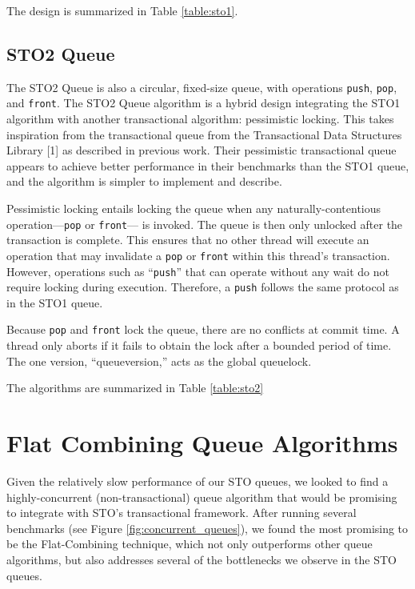 The design is summarized in Table \ref{table:sto1}.

\subsection{STO2 Queue}
%
The STO2 Queue is also a circular, fixed-size queue, with operations \texttt{push}, \texttt{pop}, and \texttt{front}. The STO2 Queue algorithm is a hybrid design integrating the STO1 algorithm with another transactional algorithm: pessimistic locking. This takes inspiration from the transactional queue from the Transactional Data Structures Library [1] as described in previous work. Their pessimistic transactional queue appears to achieve better performance in their benchmarks than the STO1 queue, and the algorithm is simpler to implement and describe. 

Pessimistic locking entails locking the queue when any naturally-contentious operation---\texttt{pop} or \texttt{front}--- is invoked. The queue is then only unlocked after the transaction is complete. This ensures that no other thread will execute an operation that may invalidate a \texttt{pop} or \texttt{front} within this thread's transaction. However, operations such as ``\texttt{push}'' that can operate without any wait do not require locking during execution. Therefore, a \texttt{push} follows the same protocol as in the STO1 queue.

Because \texttt{pop} and \texttt{front} lock the queue, there are no conflicts at commit time. A thread only aborts if it fails to obtain the lock after a bounded period of time. The one version, “queueversion,” acts as the global queuelock. 

The algorithms are summarized in Table \ref{table:sto2}


\section{Flat Combining Queue Algorithms}
Given the relatively slow performance of our STO queues, we looked to find a highly-concurrent (non-transactional) queue algorithm that would be promising to integrate with STO's transactional framework. After running several benchmarks (see Figure \ref{fig:concurrent_queues}), we found the most promising to be the Flat-Combining technique, which not only outperforms other queue algorithms, but also addresses several of the bottlenecks we observe in the STO queues.

